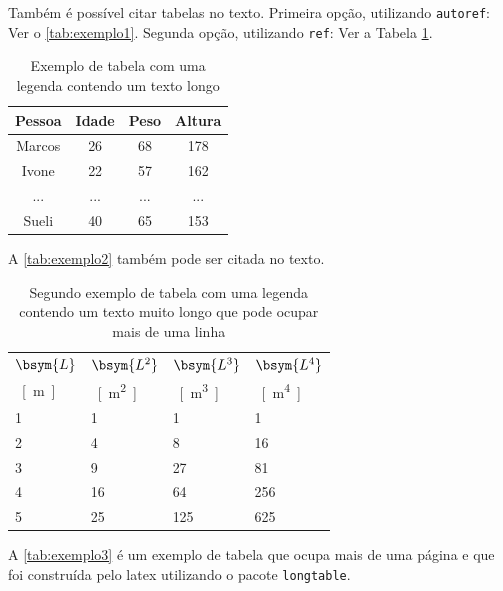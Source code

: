 Também é possível citar tabelas no texto. Primeira opção, utilizando \texttt{autoref}: Ver o \autoref{tab:exemplo1}. Segunda opção, utilizando  \texttt{ref}: Ver a Tabela \ref{tab:exemplo1}.

\begin{table}[htb]
\captionsetup{width=0.33\textwidth}
\centering
\caption{\label{tab:exemplo1}Exemplo de tabela com uma legenda contendo um texto longo}
\begin{tabular}{cccc}
	\hline
	\textbf{Pessoa} & \textbf{Idade} & \textbf{Peso} & \textbf{Altura} \\ \hline
	Marcos & 26    & 68   & 178    \\ 
	Ivone  & 22    & 57   & 162    \\ 
	...    & ...   & ...  & ...    \\ 
	Sueli  & 40    & 65   & 153    \\ \hline
\end{tabular}
\fonte{}
\end{table}

A \autoref{tab:exemplo2} também pode ser citada no texto.

\begin{table}[htb]%
\caption{Segundo exemplo de tabela com uma legenda contendo um texto muito longo que pode ocupar mais de uma linha}%
\label{tab:exemplo2}%
\begin{tabularx}{\textwidth}{@{\extracolsep{\fill}}llll}%
\toprule
$\bsym{L}$ & $\bsym{L^2}$ & $\bsym{L^3}$ & $\bsym{L^4}$ \\
\SI{}{[m]} & \SI{}{[m^2]} & \SI{}{[m^3]} & \SI{}{[m^4]} \\ \midrule
1          & 1            & 1            & 1            \\
2          & 4            & 8            & 16           \\
3          & 9            & 27           & 81           \\
4          & 16           & 64           & 256          \\
5          & 25           & 125          & 625          \\ \bottomrule
\end{tabularx}
\fonte{}%
\end{table}

A \autoref{tab:exemplo3} é um exemplo de tabela que ocupa mais de uma página e que foi construída pelo \gls{latex} utilizando o pacote \texttt{longtable}.

